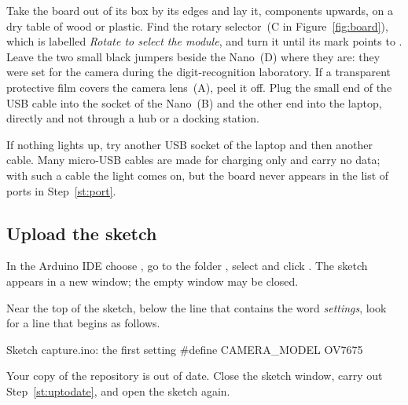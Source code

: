 Take the board out of its box by its edges and lay it, components upwards, on a dry table of
wood or plastic. Find the rotary selector~(C in Figure~\ref{fig:board}), which is labelled
\emph{Rotate to select the module}, and turn it until its mark points to . Leave
the two small black jumpers beside the Nano~(D) where they are: they were set for the camera
during the digit-recognition laboratory. If a transparent protective film covers the camera
lens~(A), peel it off. Plug the small end of the USB cable into the socket of the Nano~(B) and
the other end into the laptop, directly and not through a hub or a docking station.

\begin{iffail}
If nothing lights up, try another USB socket of the laptop and then another cable. Many
micro-USB cables are made for charging only and carry no data; with such a cable the light
comes on, but the board never appears in the list of ports in Step~\ref{st:port}.
\end{iffail}

\subsection{Upload the sketch}

In the Arduino IDE choose \then{}, go to the folder
, select  and
click . The sketch appears in a new window; the empty window may be closed.

\label{st:model}
Near the top of the sketch, below the line that contains the word \emph{settings}, look for a
line that begins as follows.
\begin{filebox}{Sketch capture.ino: the first setting}
#define CAMERA_MODEL  OV7675
\end{filebox}
\begin{iffail}
Your copy of the repository is out of date. Close the sketch window, carry out
Step~\ref{st:uptodate}, and open the sketch again.
\end{iffail}

